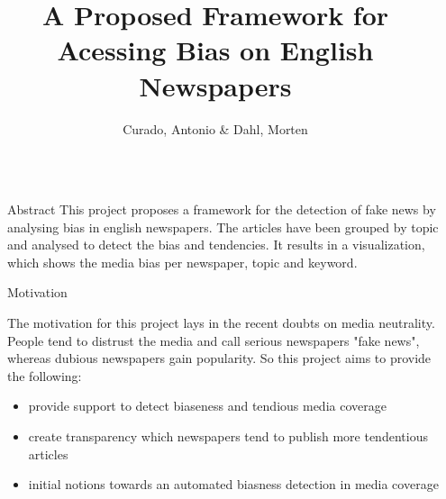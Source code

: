 \documentclass[final]{beamer}
\title{A Proposed Framework for Acessing Bias on English Newspapers {\emoji[ios]{1F4F0}}} %
\author{Curado, Antonio  \&  Dahl, Morten} %
\institute{Masters in Advanced Analytics @ Nova IMS} %
\newlength{\sepwid}
\newlength{\onecolwid}
\begin{document}

\setlength{\belowcaptionskip}{2ex} %
\setlength\belowdisplayshortskip{2ex} %

\begin{frame}[t] %

\begin{columns}[t] %

\begin{column}{\sepwid}\end{column} %

\begin{column}{\onecolwid} %



\begin{block}{Abstract}
    This project proposes a framework for the detection of fake news by analysing bias in english newspapers.
    The articles have been grouped by topic and analysed to detect the bias and tendencies.
    It results in a visualization, which shows the media bias per newspaper, topic and keyword.
\end{block}



\begin{block}{Motivation}

    The motivation for this project lays in the recent doubts on media neutrality. People tend to distrust the media and call serious newspapers "fake news", whereas dubious newspapers gain popularity. So this project aims to provide the following:
    \begin{itemize}
        \item provide support to detect biaseness and tendious media coverage
        \item create transparency which newspapers tend to publish more tendentious articles
        \item initial notions towards an automated biasness detection in media coverage
    \end{itemize}


\end{block}
\end{column}
\end{columns}
\end{frame}
\end{document}
